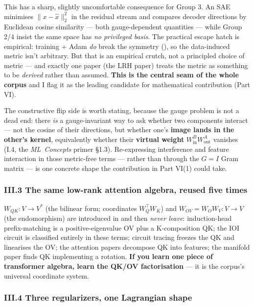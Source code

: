 This has a sharp, slightly uncomfortable consequence for Group 3. An SAE minimises $\|x-\hat x\|_2^2$ in the residual stream and compares decoder directions by Euclidean cosine similarity --- both gauge-dependent quantities --- while Group 2/4 insist the same space has \emph{no privileged basis}. The practical escape hatch is empirical: training + Adam \emph{do} break the symmetry (\textcite{privileged-bases-residual-stream}), so the data-induced metric isn't arbitrary. But that is an empirical crutch, not a principled choice of metric --- and exactly one paper (the LRH paper) treats the metric as something to be \emph{derived} rather than assumed. \textbf{This is the central seam of the whole corpus} and I flag it as the leading candidate for mathematical contribution (Part VI).


The constructive flip side is worth stating, because the gauge problem is not a dead end: there \emph{is} a gauge-invariant way to ask whether two components interact --- not the cosine of their directions, but whether one's \textbf{image lands in the other's kernel}, equivalently whether their \textbf{virtual weight} $W_{\text{in}}^B W_{\text{out}}^A$ vanishes (I.4, the \emph{ML~Concepts} primer §1.3). Re-expressing interference and feature interaction in those metric-free terms --- rather than through the $G=I$ Gram matrix --- is one concrete shape the contribution in Part VI(1) could take.


\subsubsection*{III.3 The same low-rank attention algebra, reused five times}

$W_{QK}:V\to V^{*}$ (the bilinear form; coordinates $W_Q^\top W_K$) and $W_{OV}=W_O W_V:V\to V$ (the endomorphism) are introduced in \textcite{framework} and then \emph{never leave}: induction-head prefix-matching is a positive-eigenvalue OV plus a K-composition QK; the IOI circuit is classified entirely in these terms; circuit tracing freezes the QK and linearises the OV; the attention papers decompose QK into features; the manifold paper finds QK implementing a rotation. \textbf{If you learn one piece of transformer algebra, learn the QK/OV factorisation} --- it is the corpus's universal coordinate system.


\subsubsection*{III.4 Three regularizers, one Lagrangian shape}

